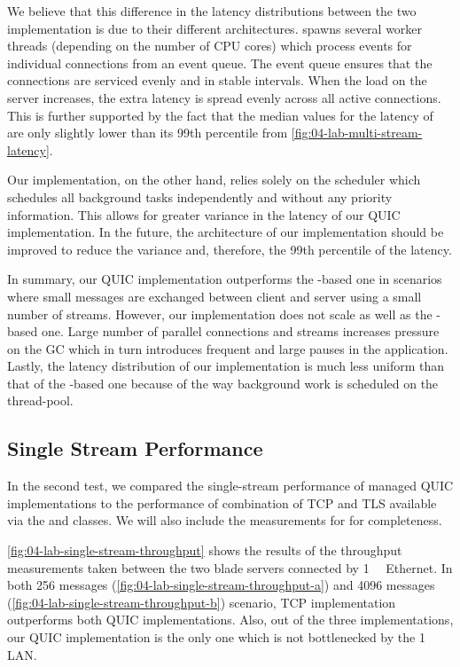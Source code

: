 We believe that this difference in the latency distributions between the two implementation is due
to their different architectures. \libmsquic{} spawns several worker threads (depending on the
number of CPU cores) which process events for individual connections from an event queue. The event
queue ensures that the connections are serviced evenly and in stable intervals. When the load on the
server increases, the extra latency is spread evenly across all active connections. This is further
supported by the fact that the median values for the latency of \libmsquic{} are only slightly lower
than its 99th percentile from \autoref{fig:04-lab-multi-stream-latency}.

Our implementation, on the other hand, relies solely on the \dotnet{}  scheduler which
schedules all background tasks independently and without any priority information. This allows for
greater variance in the latency of our QUIC implementation. In the future, the architecture of our
implementation should be improved to reduce the variance and, therefore, the 99th percentile of the
latency.

In summary, our QUIC implementation outperforms the \libmsquic{}-based one in scenarios where small
messages are exchanged between client and server using a small number of streams. However, our
implementation does not scale as well as the \libmsquic-based one. Large number of parallel
connections and streams increases pressure on the GC which in turn introduces frequent and large
pauses in the application. Lastly, the latency distribution of our implementation is much less
uniform than that of the \libmsquic{}-based one because of the way background work is scheduled on
the \dotnet{} thread-pool.

\subsection{Single Stream Performance}

In the second test, we compared the single-stream performance of managed QUIC implementations to the
performance of combination of TCP and TLS available via the \TcpClient{} and \SslStream{} \dotnet{}
classes. We will also include the measurements for \libmsquic{} for completeness.

\autoref{fig:04-lab-single-stream-throughput} shows the results of the throughput measurements taken
between the two blade servers connected by \SI{1}{\giga\bit} Ethernet. In both \SI{256}{\byte}
messages (\autoref{fig:04-lab-single-stream-throughput-a}) and \SI{4096}{\byte} messages
(\autoref{fig:04-lab-single-stream-throughput-b}) scenario, TCP implementation outperforms both QUIC
implementations. Also, out of the three implementations, our QUIC implementation is the only one
which is not bottlenecked by the \SI{1}{\giga\bit} LAN\@.

